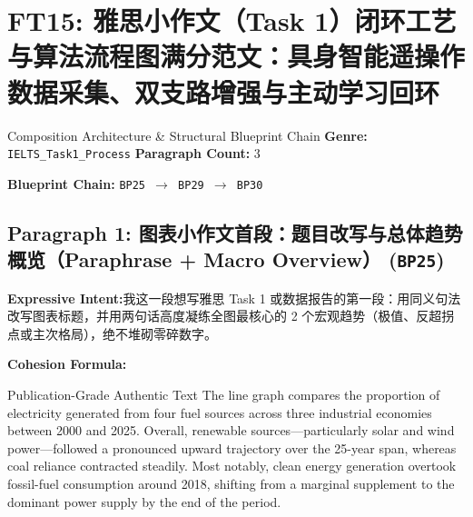 \section{FT15: 雅思小作文（Task 1）闭环工艺与算法流程图满分范文：具身智能遥操作数据采集、双支路增强与主动学习回环}\label{comp:FT15}
\begin{ConceptBox}{Composition Architecture \& Structural Blueprint Chain}
\textbf{Genre:} \texttt{IELTS\_Task1\_Process} \quad \textbf{Paragraph Count:} 3\par
\textbf{Blueprint Chain:} \texttt{BP25 $\to$ BP29 $\to$ BP30}
\end{ConceptBox}
\subsection*{Paragraph 1: 图表小作文首段：题目改写与总体趋势概览（Paraphrase + Macro Overview） (\texttt{BP25})}
\noindent\textbf{Expressive Intent:}\enspace 我这一段想写雅思 Task 1 或数据报告的第一段：用同义句法改写图表标题，并用两句话高度凝练全图最核心的 2 个宏观趋势（极值、反超拐点或主次格局），绝不堆砌零碎数字。\par
\noindent\textbf{Cohesion Formula:}\par\vspace{4pt}
\begin{ExampleBox}{Publication-Grade Authentic Text}
The line graph compares the proportion of electricity generated from four fuel sources across three industrial economies between 2000 and 2025. Overall, renewable sources---particularly solar and wind power---followed a pronounced upward trajectory over the 25-year span, whereas coal reliance contracted steadily. Most notably, clean energy generation overtook fossil-fuel consumption around 2018, shifting from a marginal supplement to the dominant power supply by the end of the period.
\end{ExampleBox}
